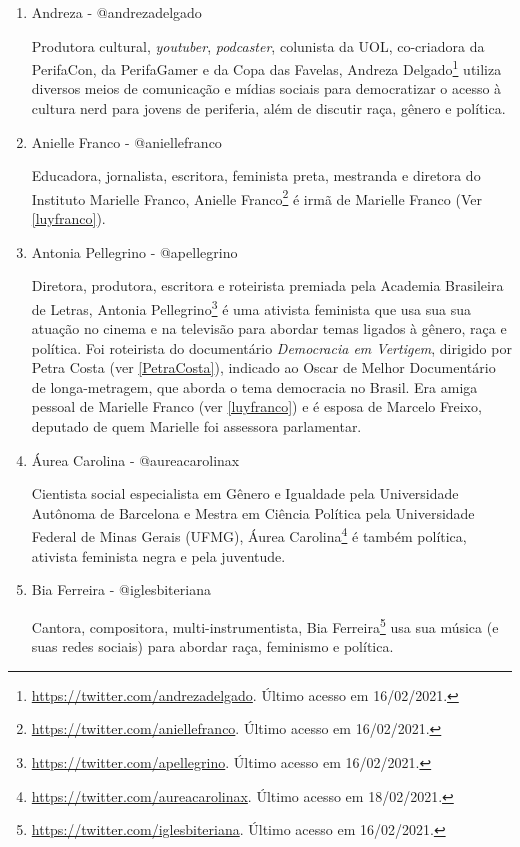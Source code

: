 \documentclass[
	12pt,				%
	openright,			%
	twoside,			%
	a4paper,			%
	english,			%
	brazil				%
	]{abntex2}
\begin{document}
\begin{anexosenv}
\begin{enumerate}
 \item Andreza - @andrezadelgado
 
 Produtora cultural, \textit{youtuber}, \textit{podcaster}, colunista da UOL, co-criadora da PerifaCon, da PerifaGamer e da Copa das Favelas, Andreza Delgado\footnote{\url{https://twitter.com/andrezadelgado}. Último acesso em 16/02/2021.} utiliza diversos meios de comunicação e mídias sociais para democratizar o acesso à cultura nerd para jovens de periferia, além de discutir raça, gênero e política.

 \item Anielle Franco - @aniellefranco\label{aniellefranco}
 
 Educadora, jornalista, escritora, feminista preta, mestranda e diretora do Instituto Marielle Franco, Anielle Franco\footnote{\url{https://twitter.com/aniellefranco}. Último acesso em 16/02/2021.} é irmã de Marielle Franco (Ver \ref{luyfranco}).

\newpage

 \item Antonia Pellegrino - @apellegrino\label{pellegrino}
 
 Diretora, produtora, escritora e roteirista premiada pela Academia Brasileira de Letras, Antonia Pellegrino\footnote{\url{https://twitter.com/apellegrino}. Último acesso em 16/02/2021.} é uma ativista feminista que usa sua sua atuação no cinema e na televisão para abordar temas ligados à gênero, raça e política. Foi roteirista do documentário \textit{Democracia em Vertigem}, dirigido por Petra Costa (ver \ref{PetraCosta}), indicado ao Oscar de Melhor Documentário de longa-metragem, que aborda o tema democracia no Brasil. Era amiga pessoal de Marielle Franco (ver \ref{luyfranco}) e é esposa de Marcelo Freixo, deputado de quem Marielle foi assessora parlamentar.

 \item Áurea Carolina - @aureacarolinax
 
 Cientista social especialista em Gênero e Igualdade pela Universidade Autônoma de Barcelona e Mestra em Ciência Política pela Universidade Federal de Minas Gerais (UFMG), Áurea Carolina\footnote{\url{https://twitter.com/aureacarolinax}. Último acesso em 18/02/2021.} é também política, ativista feminista negra e pela juventude.

 \item Bia Ferreira - @iglesbiteriana
 
 Cantora, compositora, multi-instrumentista, Bia Ferreira\footnote{\url{https://twitter.com/iglesbiteriana}. Último acesso em 16/02/2021.} usa sua música (e suas redes sociais) para abordar raça, feminismo e política.
 

\end{enumerate}
\end{anexosenv}
\end{document}
